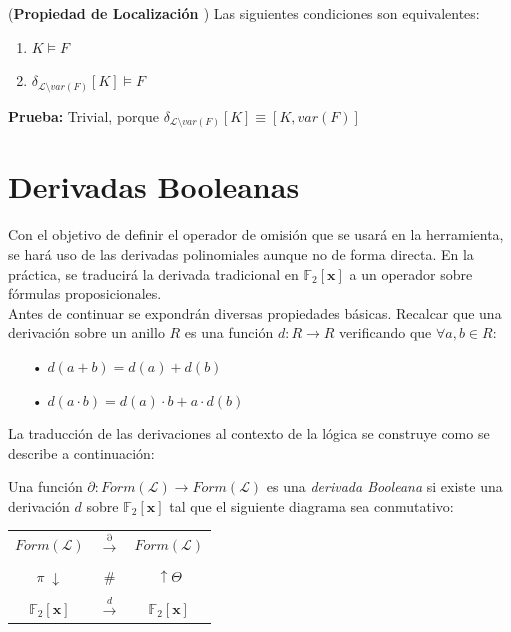 \cor (\textbf{Propiedad de Localización \cite{Borrego2009}}) Las siguientes condiciones son equivalentes:
\begin{enumerate}
\item $K \vDash F$
\item $\delta_{\mathcal{L} \setminus var(F)} [K] \vDash F$
\end{enumerate}

\noindent \textbf{Prueba:} Trivial, porque $\delta_{\mathcal{L} \setminus var(F)} [K] \equiv [K,var(F)]$

\section{Derivadas Booleanas}
Con el objetivo de definir el operador de omisión que se usará en la herramienta, se hará uso de las derivadas polinomiales aunque no de forma directa. En la práctica, se traducirá la derivada tradicional en $\mathbb{F}_2 [\textbf{x}]$ a un operador sobre fórmulas proposicionales.\\

Antes de continuar se expondrán diversas propiedades básicas. Recalcar que una derivación sobre un anillo $R$ es una función $d:R \rightarrow R$ verificando que $\forall a,b \in R$:

\begin{itemize}
\item[•] $d(a+b) = d(a) + d(b)$
\item[•] $d(a \cdot b) = d(a) \cdot b + a \cdot d(b)$
\end{itemize}

La traducción de las derivaciones al contexto de la lógica se construye como se describe a continuación:

 \cite{Borrego2009} Una función $\partial : Form(\mathcal{L}) \rightarrow Form(\mathcal{L})$ es una \textit{derivada Booleana} si existe una derivación $d$ sobre $\mathbb{F}_2 [\textbf{x}]$ tal que el siguiente diagrama sea conmutativo:

\begin{table}[h]
\centering
\begin{tabular}{ccc}
 $Form(\mathcal{L})$& $\xrightarrow{\partial} $ & $Form(\mathcal{L})$ \\ \\
 $\pi \; \downarrow $ & $\#$ & $\uparrow \Theta$ \\\\
 $\mathbb{F}_2 [\textbf{x}]$ & $\xrightarrow{d}$ & $\mathbb{F}_2 [\textbf{x}]$
\end{tabular}
\end{table}
 
